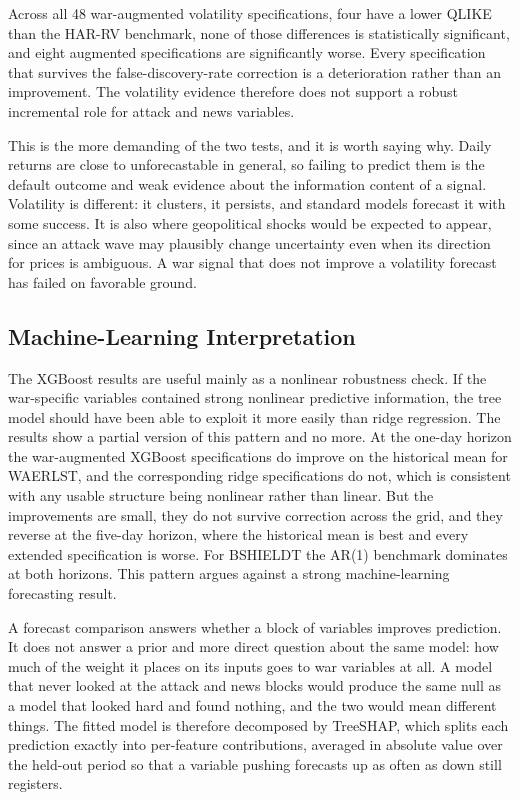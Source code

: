 \documentclass[12pt,a4paper]{article}
\begin{document}
Across all 48 war-augmented volatility specifications, four have a lower QLIKE than the HAR-RV benchmark, none of those differences is statistically significant, and eight augmented specifications are significantly worse. Every specification that survives the false-discovery-rate correction is a deterioration rather than an improvement. The volatility evidence therefore does not support a robust incremental role for attack and news variables.

This is the more demanding of the two tests, and it is worth saying why. Daily returns are close to unforecastable in general, so failing to predict them is the default outcome and weak evidence about the information content of a signal. Volatility is different: it clusters, it persists, and standard models forecast it with some success. It is also where geopolitical shocks would be expected to appear, since an attack wave may plausibly change uncertainty even when its direction for prices is ambiguous. A war signal that does not improve a volatility forecast has failed on favorable ground.

\subsection{Machine-Learning Interpretation}
\label{sec:mlinterp}

The XGBoost results are useful mainly as a nonlinear robustness check. If the war-specific variables contained strong nonlinear predictive information, the tree model should have been able to exploit it more easily than ridge regression. The results show a partial version of this pattern and no more. At the one-day horizon the war-augmented XGBoost specifications do improve on the historical mean for WAERLST, and the corresponding ridge specifications do not, which is consistent with any usable structure being nonlinear rather than linear. But the improvements are small, they do not survive correction across the grid, and they reverse at the five-day horizon, where the historical mean is best and every extended specification is worse. For BSHIELDT the AR(1) benchmark dominates at both horizons. This pattern argues against a strong machine-learning forecasting result.

A forecast comparison answers whether a block of variables improves prediction. It does not answer a prior and more direct question about the same model: how much of the weight it places on its inputs goes to war variables at all. A model that never looked at the attack and news blocks would produce the same null as a model that looked hard and found nothing, and the two would mean different things. The fitted model is therefore decomposed by TreeSHAP, which splits each prediction exactly into per-feature contributions, averaged in absolute value over the held-out period so that a variable pushing forecasts up as often as down still registers.
\end{document}
